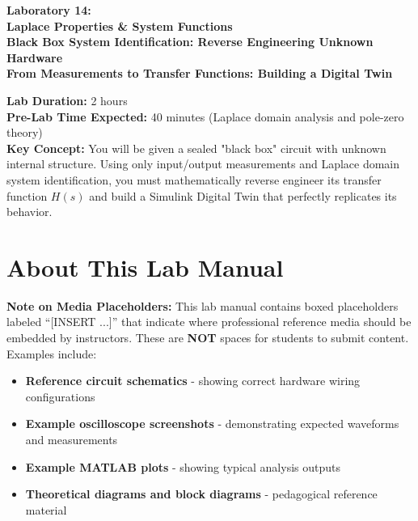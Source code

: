 \documentclass[11pt,letterpaper]{article}
\begin{document}
\begin{center}
\huge{\bf Laboratory 14:}\\
\vspace{0.2in}
\Large{\bf Laplace Properties \& System Functions}\\
\Large{\bf Black Box System Identification: Reverse Engineering Unknown Hardware}\\
\vspace{0.2in}
\normalsize{\bf From Measurements to Transfer Functions: Building a Digital Twin}
\end{center}

\vspace{0.3in}
\noindent
\textbf{Lab Duration:} 2 hours\\
\textbf{Pre-Lab Time Expected:} 40 minutes (Laplace domain analysis and pole-zero theory)\\
\textbf{Key Concept:} You will be given a sealed "black box" circuit with unknown internal structure. Using only input/output measurements and Laplace domain system identification, you must mathematically reverse engineer its transfer function $H(s)$ and build a Simulink Digital Twin that perfectly replicates its behavior.

\tableofcontents
\clearpage

\section*{About This Lab Manual}

\textbf{Note on Media Placeholders:} This lab manual contains boxed placeholders labeled ``[INSERT ...]'' that indicate where professional reference media should be embedded by instructors. These are \textbf{NOT} spaces for students to submit content. Examples include:

\begin{itemize}
    \item \textbf{Reference circuit schematics} - showing correct hardware wiring configurations
    \item \textbf{Example oscilloscope screenshots} - demonstrating expected waveforms and measurements
    \item \textbf{Example MATLAB plots} - showing typical analysis outputs
    \item \textbf{Theoretical diagrams and block diagrams} - pedagogical reference material
\end{itemize}
\end{document}

